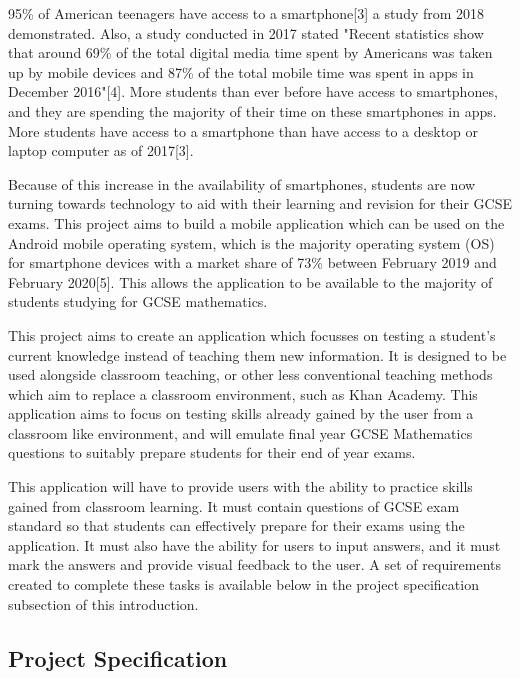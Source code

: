 \documentclass{article}
\begin{document}
95\% of American teenagers have access to a smartphone[3] a study from 2018 demonstrated. Also, a study conducted in 2017 stated "Recent statistics show that around 69\% of the total digital media time spent by Americans was taken up by mobile devices and 87\% of the total mobile time was spent in apps in December 2016"[4]. More students than ever before have access to smartphones, and they are spending the majority of their time on these smartphones in apps. More students have access to a smartphone than have access to a desktop or laptop computer as of 2017[3]. \par

Because of this increase in the availability of smartphones, students are now turning towards technology to aid with their learning and revision for their GCSE exams. This project aims to build a mobile application which can be used on the Android mobile operating system, which is the majority operating system (OS) for smartphone devices with a market share of 73\% between February 2019 and February 2020[5]. This allows the application to be available to the majority of students studying for GCSE mathematics. \par

This project aims to create an application which focusses on testing a student's current knowledge instead of teaching them new information. It is designed to be used alongside classroom teaching, or other less conventional teaching methods which aim to replace a classroom environment, such as Khan Academy. This application aims to focus on testing skills already gained by the user from a classroom like environment, and will emulate final year GCSE Mathematics questions to suitably prepare students for their end of year exams. \par

This application will have to provide users with the ability to practice skills gained from classroom learning. It must contain questions of GCSE exam standard so that students can effectively prepare for their exams using the application. It must also have the ability for users to input answers, and it must mark the answers and provide visual feedback to the user. A set of requirements created to complete these tasks is available below in the project specification subsection of this introduction. \par

\subsection{Project Specification}
\end{document}
